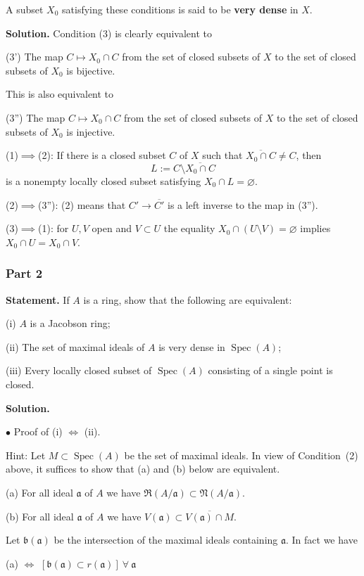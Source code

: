 \documentclass[parskip=half,fontsize=12pt]{scrartcl}%
\newcommand{\mf}{\mathfrak}
\newcommand{\aaa}{\mf a}
\newcommand{\bbb}{\mf b}
\newcommand{\bu}{\bullet}
\newcommand{\Spec}{\operatorname{Spec}}\newcommand{\Sp}{\operatorname{Spec}}
\begin{document}
A subset $X_0$ satisfying these conditions is said to be \textbf{very dense} in $X$. 

\textbf{Solution.} Condition (3) is clearly equivalent to 

(3') The map $C\mapsto X_0\cap C$ from the set of closed subsets of $X$ to the set of closed subsets of $X_0$ is bijective.

This is also equivalent to 

(3'') The map $C\mapsto X_0\cap C$ from the set of closed subsets of $X$ to the set of closed subsets of $X_0$ is injective.

(1)$\implies$(2): If there is a closed subset $C$ of $X$ such that $\overline{X_0\cap C}\ne C$, then 
$$
L:=C\setminus\overline{X_0\cap C}
$$ 
is  a nonempty locally closed subset satisfying $X_0\cap L=\varnothing$. 

(2)$\implies$(3''): (2) means that $C'\to\overline{C'}$ is a left inverse to the map in (3''). 

(3)$\implies$(1): for $U,V$ open and $V\subset U$ the equality $X_0\cap(U\setminus V)=\varnothing$ implies $X_0\cap U=X_0\cap V$.%

\subsubsection{Part 2} 

\textbf{Statement.} If $A$ is a ring, show that the following are equivalent:

(i) $A$ is a Jacobson ring;

(ii) The set of maximal ideals of $A$ is very dense in $\Spec(A)$;

(iii) Every locally closed subset of $\Spec(A)$ consisting of a single point is closed.

\textbf{Solution.} 

$\bu$ Proof of (i) $\iff$ (ii). 

Hint: Let $M\subset\Spec(A)$ be the set of maximal ideals. In view of Condition~(2) above, it suffices to show that (a) and (b) below are equivalent.

(a) For all ideal $\aaa$ of $A$ we have $\mf R(A/\aaa)\subset\mf N(A/\aaa)$.

(b) For all ideal $\aaa$ of $A$ we have $V(\aaa)\subset\overline{V(\aaa)\cap M}$.

Let $\bbb(\aaa)$ be the intersection of the maximal ideals containing $\aaa$. In fact we have\medskip 

\centerline{(a) $\iff$ $[\bbb(\aaa)\subset r(\aaa)]\ \forall\ \aaa$}\bigskip
\end{document}
